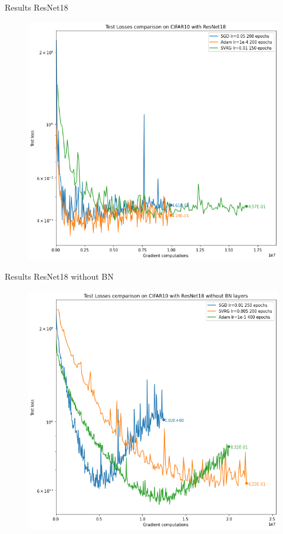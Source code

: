 \documentclass[10pt]{beamer}
\begin{document}
\begin{frame}{Results ResNet18}
     \begin{figure}
         \centering
         \includegraphics[scale=0.35]{report/figures/ResNet18Results.png}
         \label{fig:resnet18results}
     \end{figure}
\end{frame}

\begin{frame}{Results ResNet18 without BN}
     \begin{figure}
         \centering
         \includegraphics[scale=0.35]{report/figures/ResNet18noBNResults.png}
         \label{fig:resnet18noBNresults}
     \end{figure}
\end{frame}
\end{document}
